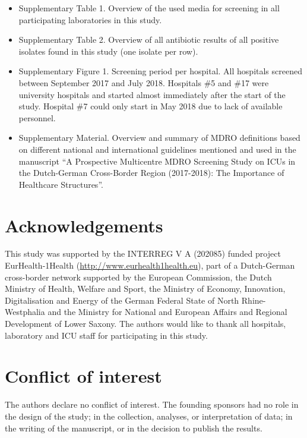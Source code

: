 \documentclass[
]{book}
\providecommand{\tightlist}{%
  \setlength{\itemsep}{0pt}\setlength{\parskip}{0pt}}
\begin{document}
\begin{itemize}
\tightlist
\item
  Supplementary Table 1. Overview of the used media for screening in all participating laboratories in this study.
\item
  Supplementary Table 2. Overview of all antibiotic results of all positive isolates found in this study (one isolate per row).
\item
  Supplementary Figure 1. Screening period per hospital. All hospitals screened between September 2017 and July 2018. Hospitals \#5 and \#17 were university hospitals and started almost immediately after the start of the study. Hospital \#7 could only start in May 2018 due to lack of available personnel.
\item
  Supplementary Material. Overview and summary of MDRO definitions based on different national and international guidelines mentioned and used in the manuscript ``A Prospective Multicentre MDRO Screening Study on ICUs in the Dutch-German Cross-Border Region (2017-2018): The Importance of Healthcare Structures''.
\end{itemize}

\hypertarget{acknowledgements-5}{%
\section*{Acknowledgements}\label{acknowledgements-5}}

This study was supported by the INTERREG V A (202085) funded project EurHealth-1Health (\url{http://www.eurhealth1health.eu}), part of a Dutch-German cross-border network supported by the European Commission, the Dutch Ministry of Health, Welfare and Sport, the Ministry of Economy, Innovation, Digitalisation and Energy of the German Federal State of North Rhine-Westphalia and the Ministry for National and European Affairs and Regional Development of Lower Saxony. The authors would like to thank all hospitals, laboratory and ICU staff for participating in this study.

\hypertarget{conflict-of-interest-1}{%
\section*{Conflict of interest}\label{conflict-of-interest-1}}

The authors declare no conflict of interest. The founding sponsors had no role in the design of the study; in the collection, analyses, or interpretation of data; in the writing of the manuscript, or in the decision to publish the results.
\end{document}
